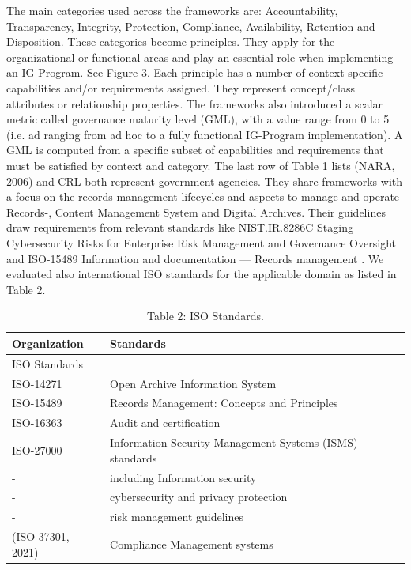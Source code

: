 \documentclass[a4paper,twoside]{article}
\begin{document}
The main categories used across the frameworks are: Accountability, Transparency, Integrity, Protection, Compliance, Availability, Retention and Disposition. These categories become principles. They apply for the organizational or functional areas and play an essential role when implementing an IG-Program. See Figure 3. Each principle has a number of context specific capabilities and/or requirements assigned. They represent concept/class attributes or relationship properties. The frameworks also introduced a scalar metric called governance maturity level (GML), with a value range from 0 to 5 (i.e. ad ranging from ad hoc to a fully functional IG-Program implementation). A GML is computed from a specific subset of capabilities and requirements that must be satisfied by context and category. The last row of Table 1 lists (NARA, 2006) and CRL both represent government agencies. They share frameworks with a focus on the records management lifecycles and aspects to manage and operate Records-, Content Management System and Digital Archives. Their guidelines draw requirements from relevant standards like NIST.IR.8286C Staging Cybersecurity Risks for Enterprise Risk Management and Governance Oversight \cite{Quinn2022} and ISO-15489 Information and documentation — Records management \cite{ISO15489-2016}. We evaluated also international ISO standards for the applicable domain as listed in Table 2. 
\begin{table}[ht]
\caption{Table 2: ISO Standards.}
\label{tab:standards} \centering
 \scalebox{0.55} {\begin{tabular}{|l|l|}
 \hline
  {Organization} & {Standards}\\
  \hline
  {ISO Standards}	 & {}\\
  \hline
  {ISO-14271} & {Open Archive Information System}\\
  \hline
  {ISO-15489} & {Records Management: Concepts and Principles} \\
  \hline
  {ISO-16363}	& {Audit and certification} \\
  \hline
  {ISO-27000} & {Information Security Management Systems (ISMS) standards} \\
  \hline 
  {-}  & {including Information security} \\
  {-}  & {cybersecurity and privacy protection } \\
  {-}  & {risk management guidelines} \\
  {(ISO-37301, 2021)}  & {Compliance Management systems } \\
  \hline
 \end{tabular}}
\end{table}
\end{document}

